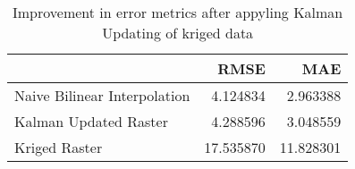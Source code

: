\begin{table}
\caption{Improvement in error metrics after appyling Kalman Updating of kriged data}
\label{tab:oahu4_lidar_error}
\begin{tabular}{lrr}
\toprule
 & RMSE & MAE \\
\midrule
Naive Bilinear Interpolation & 4.124834 & 2.963388 \\
Kalman Updated Raster & 4.288596 & 3.048559 \\
Kriged Raster & 17.535870 & 11.828301 \\
\bottomrule
\end{tabular}
\end{table}
